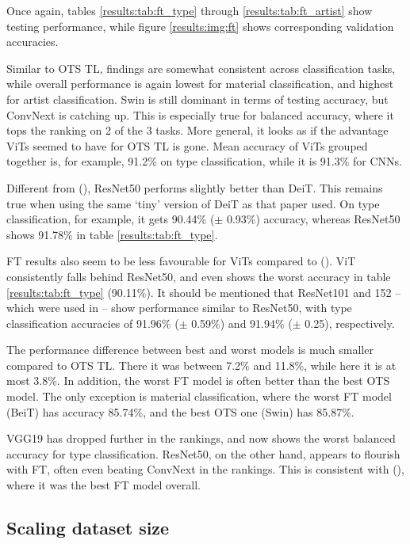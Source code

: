 Once again, tables \ref{results:tab:ft_type} through \ref{results:tab:ft_artist} show testing performance, while figure \ref{results:img:ft} shows corresponding validation accuracies.

Similar to OTS TL, findings are somewhat consistent across classification tasks, while overall performance is again lowest for material classification, and highest for artist classification. Swin is still dominant in terms of testing accuracy, but Conv\-Next is catching up. This is especially true for balanced accuracy, where it tops the ranking on 2 of the 3 tasks. More general, it looks as if the advantage ViTs seemed to have for OTS TL is gone. Mean accuracy of ViTs grouped together is, for example, 91.2\% on type classification, while it is 91.3\% for CNNs.

Different from \citeauthor{matsoukas2021time} (\citeyear{matsoukas2021time}), ResNet50 performs slightly better than DeiT. This remains true when using the same `tiny' version of DeiT as that paper used. On type classification, for example, it gets 90.44\% ($\pm$ 0.93\%) accuracy, whereas ResNet50 shows 91.78\% in table \ref{results:tab:ft_type}.

FT results also seem to be less favourable for ViTs compared to \citeauthor{zhou2021convnets} (\citeyear{zhou2021convnets}). ViT consistently falls behind ResNet50, and even shows the worst accuracy in table \ref{results:tab:ft_type} (90.11\%). It should be mentioned that ResNet101 and 152  -- which were used in \citeauthor{zhou2021convnets} --  show performance similar to ResNet50, with type classification accuracies of 91.96\% ($\pm$ 0.59\%) and 91.94\% ($\pm$ 0.25), respectively.

The performance difference between best and worst models is much smaller compared to OTS TL. There it was between 7.2\% and 11.8\%, while here it is at most 3.8\%. In addition, the worst FT model is often better than the best OTS model. The only exception is material classification, where the worst FT model (BeiT) has accuracy 85.74\%, and the best OTS one (Swin) has 85.87\%.

VGG19 has dropped further in the rankings, and now shows the worst balanced accuracy for type classification. ResNet50, on the other hand, appears to flourish with FT, often even beating ConvNext in the rankings. This is consistent with \citeauthor{sabatelli2018deep} (\citeyear{sabatelli2018deep}), where it was the best FT model overall.

\subsection{Scaling dataset size}

